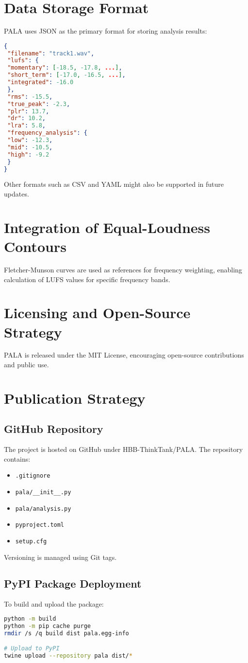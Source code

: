 \documentclass{article}
\begin{document}
\section{Data Storage Format}
PALA uses JSON as the primary format for storing analysis results:
\begin{lstlisting}[language=json]
{
 "filename": "track1.wav",
 "lufs": {
 "momentary": [-18.5, -17.8, ...],
 "short_term": [-17.0, -16.5, ...],
 "integrated": -16.0
 },
 "rms": -15.5,
 "true_peak": -2.3,
 "plr": 13.7,
 "dr": 10.2,
 "lra": 5.8,
 "frequency_analysis": {
 "low": -12.3,
 "mid": -10.5,
 "high": -9.2
 }
}
\end{lstlisting}
Other formats such as CSV and YAML might also be supported in future updates.

\section{Integration of Equal-Loudness Contours}
Fletcher-Munson curves are used as references for frequency weighting, enabling calculation of LUFS values for specific frequency bands.

\section{Licensing and Open-Source Strategy}
PALA is released under the MIT License, encouraging open-source contributions and public use.

\section{Publication Strategy}
\subsection{GitHub Repository}
The project is hosted on GitHub under HBB-ThinkTank/PALA. The repository contains:
\begin{itemize}
    \item \texttt{.gitignore}
    \item \texttt{pala/\_\_init\_\_.py}
    \item \texttt{pala/analysis.py}
    \item \texttt{pyproject.toml}
    \item \texttt{setup.cfg}
\end{itemize}
Versioning is managed using Git tags.

\subsection{PyPI Package Deployment}
To build and upload the package:
\begin{lstlisting}[language=bash]
python -m build
python -m pip cache purge
rmdir /s /q build dist pala.egg-info

# Upload to PyPI
twine upload --repository pala dist/*
\end{lstlisting}
\end{document}
